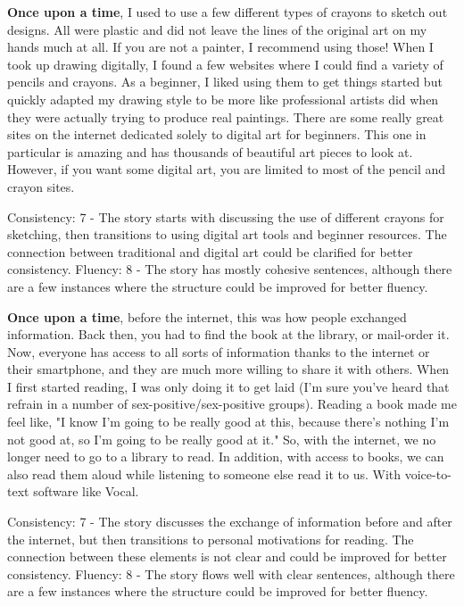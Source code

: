 \documentclass{article}
\begin{document}
\textbf{Once upon a time}, I used to use a few different types of crayons to sketch out designs. All were plastic and did not leave the lines of the original art on my hands much at all. If you are not a painter, I recommend using those! When I took up drawing digitally, I found a few websites where I could find a variety of pencils and crayons. As a beginner, I liked using them to get things started but quickly adapted my drawing style to be more like professional artists did when they were actually trying to produce real paintings. There are some really great sites on the internet dedicated solely to digital art for beginners. This one in particular is amazing and has thousands of beautiful art pieces to look at. However, if you want some digital art, you are limited to most of the pencil and crayon sites.

Consistency: 7 - The story starts with discussing the use of different crayons for sketching, then transitions to using digital art tools and beginner resources. The connection between traditional and digital art could be clarified for better consistency.
Fluency: 8 - The story has mostly cohesive sentences, although there are a few instances where the structure could be improved for better fluency.

\textbf{Once upon a time}, before the internet, this was how people exchanged information. Back then, you had to find the book at the library, or mail-order it. Now, everyone has access to all sorts of information thanks to the internet or their smartphone, and they are much more willing to share it with others. When I first started reading, I was only doing it to get laid (I'm sure you've heard that refrain in a number of sex-positive/sex-positive groups). Reading a book made me feel like, "I know I'm going to be really good at this, because there's nothing I'm not good at, so I'm going to be really good at it." So, with the internet, we no longer need to go to a library to read. In addition, with access to books, we can also read them aloud while listening to someone else read it to us. With voice-to-text software like Vocal.

Consistency: 7 - The story discusses the exchange of information before and after the internet, but then transitions to personal motivations for reading. The connection between these elements is not clear and could be improved for better consistency.
Fluency: 8 - The story flows well with clear sentences, although there are a few instances where the structure could be improved for better fluency.
\end{document}
